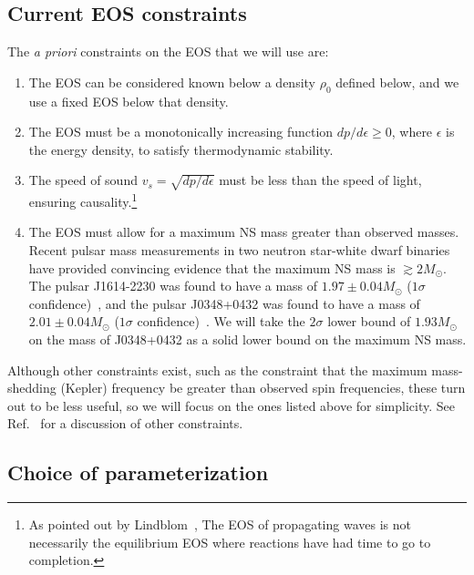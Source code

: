 \documentclass[twocolumn,prd,amssymb,aps,nofootinbib,showpacs,epsf]{revtex4}
\begin{document}
\subsection{Current EOS constraints}
\label{sec:eosconstraints}

The {\it a priori} constraints on the EOS that we will use are:
\begin{enumerate}
\item The EOS can be considered known below a density $\rho_0$ defined below, and we use a fixed EOS below that density.
\item The EOS must be a monotonically increasing function $dp/d\epsilon \ge 0$, where $\epsilon$ is the energy density, to satisfy thermodynamic stability.
\item The speed of sound $v_s = \sqrt{dp/d\epsilon}$ must be less than the speed of light, ensuring causality.\footnote{As pointed out by Lindblom~\cite{Lindblom2010}, The EOS of propagating waves is not necessarily the equilibrium EOS where reactions have had time to go to completion.} 
\item The EOS must allow for a maximum NS mass greater than observed masses. Recent pulsar mass measurements in two neutron star-white dwarf binaries have provided convincing evidence that the maximum NS mass is $\gtrsim 2M_\odot$. The pulsar J1614-2230 was found to have a mass of $1.97\pm0.04M_\odot$ ($1\sigma$ confidence)~\cite{DemorestPennucciRansom2010}, and the pulsar J0348+0432 was found to have a mass of $2.01\pm0.04M_\odot$ ($1\sigma$ confidence)~\cite{AntoniadisFreireWex2013}. We will take the $2\sigma$ lower bound of $1.93M_\odot$ on the mass of J0348+0432 as a solid lower bound on the maximum NS mass.
\end{enumerate}

Although other constraints exist, such as the constraint that the maximum mass-shedding (Kepler) frequency be greater than observed spin frequencies, these turn out to be less useful, so we will focus on the ones listed above for simplicity. See Ref.~\cite{ReadLackey2009} for a discussion of other constraints.

\subsection{Choice of parameterization}
\label{sec:eosparam}
\end{document}
